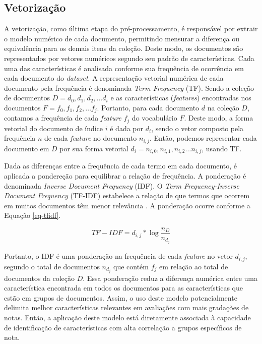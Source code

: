 \subsection{Vetorização}

A vetorização, como última etapa do pré-processamento, é responsável por extrair o modelo numérico de cada documento, permitindo mensurar a diferença ou equivalência para os demais itens da coleção. Deste modo, os documentos são representados por vetores numéricos segundo seu padrão de características. Cada uma das características é analisada conforme sua frequência de ocorrência em cada documento do \textit{dataset}. A representação vetorial numérica de cada documento pela frequência é denominada \textit{Term Frequency} (TF). Sendo a coleção de documentos $ D = { d_{0}, d_{1}, d_{2}, \hdots d_{i} } $ e as características (\textit{features}) encontradas nos documentos $ F = { f_{0}, f_{1}, f_{2}, \hdots f_{j} } $.  Portanto, para cada documento $ d $ na coleção $ D $, contamos a frequência de cada \textit{feature} $ f_{j} $ do vocabulário $ F $. Deste modo, a forma vetorial do documento de índice $ i $ é dada por $ d_{i} $, sendo o vetor composto pela frequência $ n $ de cada \textit{feature} no documento $ n_{i, j} $. Então, podemos representar cada documento em $ D $ por sua forma vetorial $ d_{i} = { n_{i, 0}, n_{i, 1}, n_{i, 2} \hdots n_{i,j}} $, usando TF.

Dada as diferenças entre a frequência de cada termo em cada documento, é aplicada a pondereção para equilibrar a relação de frequência. A ponderação é denominada \textit{Inverse Document Frequency} (IDF). O \textit{Term Frequency-Inverse Document Frequency} (TF-IDF) estabelece a relação de que termos que ocorrem em muitos documentos têm menor relevância \cite{baeza2011}. A ponderação ocorre conforme a Equação \ref{eq-tfidf}.

\begin{equation}
TF-IDF = d_{i,j}* \log \frac{n_{D}}{n_{d_{j}}} 
\end{equation}


Portanto, o IDF é uma ponderação na frequência de cada \textit{feature} no vetor $ d_{i, j} $, segundo o total de documentos $ n_{d_{j}} $ que contém $ f_{j} $ em relação ao total de documentos da coleção $ D $. Essa ponderação reduz a diferença numérica entre uma característica encontrada em todos os documentos para as características que estão em grupos de documentos. Assim, o uso deste modelo potencialmente delimita melhor características relevantes em avaliações com mais gradações de notas. Então, a aplicação deste modelo está diretamente associada à capacidade de identificação de características com alta correlação a grupos específicos de nota.

